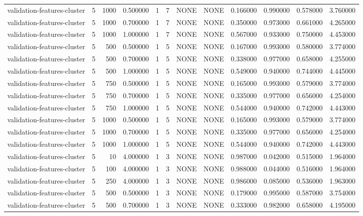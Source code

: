 \begin{tabular}{lrrrllllrrrr}
validation-features-cluster & 5 & 1000 & 0.500000 & 1 & 7 & NONE & NONE & 0.166000 & 0.990000 & 0.578000 & 3.760000 \\
validation-features-cluster & 5 & 1000 & 0.700000 & 1 & 7 & NONE & NONE & 0.350000 & 0.973000 & 0.661000 & 4.265000 \\
validation-features-cluster & 5 & 1000 & 1.000000 & 1 & 7 & NONE & NONE & 0.567000 & 0.933000 & 0.750000 & 4.453000 \\
validation-features-cluster & 5 & 500 & 0.500000 & 1 & 5 & NONE & NONE & 0.167000 & 0.993000 & 0.580000 & 3.774000 \\
validation-features-cluster & 5 & 500 & 0.700000 & 1 & 5 & NONE & NONE & 0.338000 & 0.977000 & 0.658000 & 4.255000 \\
validation-features-cluster & 5 & 500 & 1.000000 & 1 & 5 & NONE & NONE & 0.549000 & 0.940000 & 0.744000 & 4.445000 \\
validation-features-cluster & 5 & 750 & 0.500000 & 1 & 5 & NONE & NONE & 0.165000 & 0.993000 & 0.579000 & 3.774000 \\
validation-features-cluster & 5 & 750 & 0.700000 & 1 & 5 & NONE & NONE & 0.335000 & 0.977000 & 0.656000 & 4.254000 \\
validation-features-cluster & 5 & 750 & 1.000000 & 1 & 5 & NONE & NONE & 0.544000 & 0.940000 & 0.742000 & 4.443000 \\
validation-features-cluster & 5 & 1000 & 0.500000 & 1 & 5 & NONE & NONE & 0.165000 & 0.993000 & 0.579000 & 3.774000 \\
validation-features-cluster & 5 & 1000 & 0.700000 & 1 & 5 & NONE & NONE & 0.335000 & 0.977000 & 0.656000 & 4.254000 \\
validation-features-cluster & 5 & 1000 & 1.000000 & 1 & 5 & NONE & NONE & 0.544000 & 0.940000 & 0.742000 & 4.443000 \\
validation-features-cluster & 5 & 10 & 4.000000 & 1 & 3 & NONE & NONE & 0.987000 & 0.042000 & 0.515000 & 1.964000 \\
validation-features-cluster & 5 & 100 & 4.000000 & 1 & 3 & NONE & NONE & 0.988000 & 0.044000 & 0.516000 & 1.964000 \\
validation-features-cluster & 5 & 250 & 4.000000 & 1 & 3 & NONE & NONE & 0.986000 & 0.085000 & 0.536000 & 1.963000 \\
validation-features-cluster & 5 & 500 & 0.500000 & 1 & 3 & NONE & NONE & 0.179000 & 0.995000 & 0.587000 & 3.754000 \\
validation-features-cluster & 5 & 500 & 0.700000 & 1 & 3 & NONE & NONE & 0.333000 & 0.982000 & 0.658000 & 4.195000 \\

\end{tabular}
